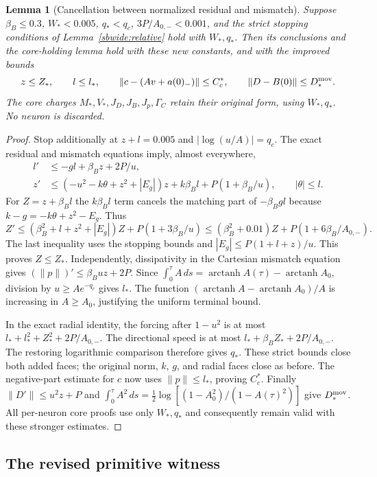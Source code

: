 \documentclass{article} %
\theoremstyle{plain}
\newtheorem{lemma}[theorem]{Lemma}
\theoremstyle{definition}
\theoremstyle{remark}
\begin{document}
\begin{lemma}[Cancellation between normalized residual and mismatch]
\label{sbsharp:weighted}
Suppose $\beta_B\le0.3$, $W_*<0.005$, $q_*<q_c$,
$3P/A_{0,-}<0.001$, and the strict stopping conditions of
Lemma~\ref{sbwide:relative} hold with $W_*,q_*$.
Then its conclusions and the core-holding lemma hold with these new
constants, and with the improved bounds
\[
 z\le Z_*,\qquad l\le l_*,\qquad
 \|c-(Av+a(0)_-)\|\le C_c^*,\qquad
 \|D-B(0)\|\le D_*^{\rm mov}.
\]
The core charges $M_*,V_*,J_D,J_B,J_p,\Gamma_C$ retain their original
form, using $W_*,q_*$. No neuron is discarded.
\end{lemma}
\begin{proof}
Stop additionally at $z+l=0.005$ and $|\log(u/A)|=q_c$.
The exact residual and mismatch equations imply, almost everywhere,
\begin{align*}
 l'&\le-gl+\beta_Bz+2P/u,\\
 z'&\le(-u^2-k\theta+z^2+|E_g|)z
                    +k\beta_Bl+P(1+\beta_B/u),
 \qquad |\theta|\le l.
\end{align*}
For $Z=z+\beta_Bl$ the $k\beta_Bl$ term cancels the matching part of
$-\beta_Bgl$ because $k-g=-k\theta+z^2-E_g$. Thus
\[
 Z'\le(\beta_B^2+l+z^2+|E_g|)Z+P(1+3\beta_B/u)
 \le(\beta_B^2+0.01)Z+P(1+6\beta_B/A_{0,-}).
\]
The last inequality uses the stopping bounds and
$|E_g|\le P(1+l+z)/u$. This proves $Z\le Z_*$.
Independently, dissipativity in the Cartesian mismatch equation gives
$(\|p\|)'\le\beta_Buz+2P$. Since
$\int_0^\tau A\,ds=\operatorname{arctanh}A(\tau)
-\operatorname{arctanh}A_0$, division by $u\ge Ae^{-q_c}$ gives $l_*$.
The function $(\operatorname{arctanh}A-\operatorname{arctanh}A_0)/A$
is increasing in $A\ge A_0$, justifying the uniform terminal bound.

In the exact radial identity, the forcing after $1-u^2$ is at most
$l_*+l_*^2+Z_*^2+2P/A_{0,-}$. The directional speed is at most
$l_*+\beta_BZ_*+2P/A_{0,-}$. The restoring logarithmic comparison
therefore gives $q_*$. These strict bounds close both added faces;
the original norm, $k$, $g$, and radial faces close as before.
The negative-part estimate for $c$ now uses $\|p\|\le l_*$, proving
$C_c^*$. Finally $\|D'\|\le u^2z+P$ and
$\int_0^\tau A^2\,ds=\frac12\log[(1-A_0^2)/(1-A(\tau)^2)]$
give $D_*^{\rm mov}$. All per-neuron core proofs use only $W_*,q_*$
and consequently remain valid with these stronger estimates.
\end{proof}

\subsection{The revised primitive witness}
\end{document}
